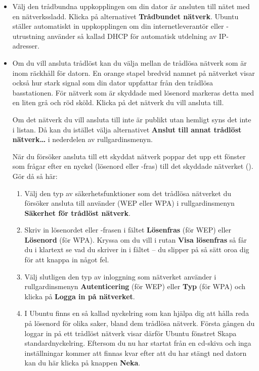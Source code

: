 \documentclass[a4paper,final]{memoir} %
\begin{document}
\begin{itemize}

\item Välj den trådbundna uppkopplingen om din dator är ansluten till nätet med en nätverkssladd. Klicka på alternativet \textbf{Trådbundet nätverk}. Ubuntu ställer automatiskt in uppkopplingen om din internetleverantör eller -utrustning använder så kallad DHCP för automatisk utdelning av IP-adresser. 

\item Om du vill ansluta trådlöst kan du välja mellan de trådlösa nätverk som är inom räckhåll för datorn. En orange stapel bredvid namnet på nätverket visar också hur stark signal som din dator uppfattar från den trådlösa basstationen. För nätverk som är skyddade med lösenord markeras detta med en liten grå och röd sköld. Klicka på det nätverk du vill ansluta till.

Om det nätverk du vill ansluta till inte är publikt utan hemligt syns det inte i listan. Då kan du istället välja alternativet \textbf{Anslut till annat trådlöst nätverk\ldots{}} i nederdelen av rullgardinsmenyn.

När du försöker ansluta till ett skyddat nätverk poppar det upp ett fönster som frågar efter en nyckel (lösenord eller -fras) till det skyddade nätverket (). Gör då så här:


\begin{enumerate}

\item Välj den typ av säkerhetsfunktioner som det trådlösa nätverket du försöker ansluta till använder (WEP eller WPA) i rullgardinsmenyn \textbf{Säkerhet för trådlöst nätverk}. 

\item Skriv in lösenordet eller -frasen i fältet \textbf{Lösenfras} (för WEP) eller \textbf{Lösenord} (för WPA). Kryssa om du vill i rutan \textbf{Visa lösenfras} så får du i klartext se vad du skriver in i fältet -- du slipper på så sätt oroa dig för att knappa in något fel. 

\item Välj slutligen den typ av inloggning som nätverket använder i rullgardinsmenyn \textbf{Autenticering} (för WEP) eller \textbf{Typ} (för WPA) och klicka på \textbf{Logga in på nätverket}.

\item I Ubuntu finns en så kallad nyckelring som kan hjälpa dig att hålla reda på lösenord för olika saker, bland dem trådlösa nätverk. Första gången du loggar in på ett trådlöst nätverk visar därför Ubuntu fönstret Skapa standardnyckelring. Eftersom du nu har startat från en cd-skiva och inga inställningar kommer att finnas kvar efter att du har stängt ned datorn kan du här klicka på knappen \textbf{Neka}. 

\end{enumerate}

\end{itemize}
\end{document}
